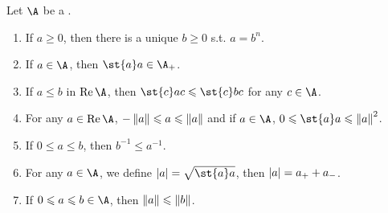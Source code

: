 \begin{prop}
	Let $\A$ be a \Cs.
	\begin{enumerate}[label=\arabic*)]
		\item If $a \geqslant 0$, then there is a unique $b \geqslant 0$ s.t. $a = b^n$.
		\item If $a \in \A$, then $\st{a}a \in \A_{+}$.
		\item If $a \leqslant b$ in $\Rea{\A}$, then $\st{c}ac \leqslant \st{c}bc$ for any $c \in \A$.
		\item For any $a \in \Rea{\A}$, $-\left\lVert a\right\lVert \leqslant a \leqslant \left\lVert a\right\lVert$ and if $a \in \A$, $0 \leqslant \st{a}a \leqslant \norm{a}^2$.
		\item If $0 \leqslant a \leqslant b$, then $b^{-1} \leqslant a^{-1}$.
		\item For any $a \in \A$, we define $\abs{a} = \sqrt{\st{a}a}$, then $\left\lvert a\right\lvert = a_{+}+a_{-}$.
		\item If $0 \leqslant a \leqslant b \in \A$, then $\left\lVert a\right\lVert \leqslant \left\lVert b\right\lVert$.
	\end{enumerate}
\end{prop}
